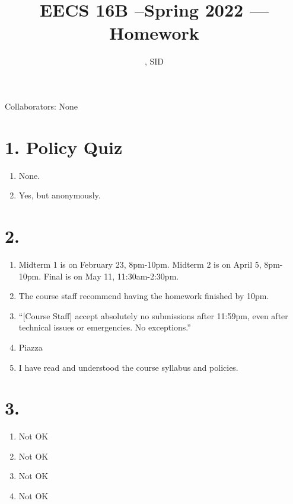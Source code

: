 \documentclass[11pt]{article}
\title{EECS 16B --Spring 2022 --- Homework \Homework}
\author{\Name, SID \SID}
\date{}
\newenvironment{qparts}{\begin{enumerate}[{(}a{)}]}{\end{enumerate}}
\begin{document}
\maketitle

Collaborators: None

\section*{1. Policy Quiz}
\begin{qparts}
\item
None.

\item
Yes, but anonymously.
\end{qparts}



\newpage
\section*{2.}
\begin{qparts}
\item
Midterm 1 is on February 23, 8pm-10pm. Midterm 2 is on April 5, 8pm-10pm. Final is on May 11, 11:30am-2:30pm.

\item
The course staff recommend having the homework finished by 10pm.

\item
``[Course Staff] accept absolutely no submissions after 11:59pm, even after technical issues or emergencies. No exceptions.''

\item
Piazza

\item
I have read and understood the course syllabus and policies.

\end{qparts}


\newpage
\section*{3.}
\begin{qparts}
\item
Not OK
\item
Not OK
\item
Not OK
\item
Not OK
\end{qparts}


\newpage
\end{document}
